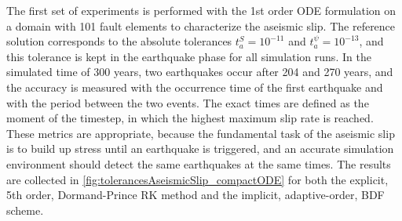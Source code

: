 The first set of experiments is performed with the 1st order ODE formulation on a domain with 101 fault elements to characterize the aseismic slip. The reference solution corresponds to the absolute tolerances $t_a^S =10^{-11}$ and $t_a^\psi =10^{-13}$, and this tolerance is kept in the earthquake phase for all simulation runs. In the simulated time of 300 years, two earthquakes occur after 204 and 270 years, and the accuracy is measured with the occurrence time of the first earthquake and with the period between the two events. The exact times are defined as the moment of the timestep, in which the highest maximum slip rate is reached. These metrics are appropriate, because the fundamental task of the aseismic slip is to build up stress until an earthquake is triggered, and an accurate simulation environment should detect the same earthquakes at the same times. The results are collected in \autoref{fig:tolerancesAseismicSlip_compactODE} for both the explicit, 5th order, Dormand-Prince RK method and the implicit, adaptive-order, BDF scheme.
